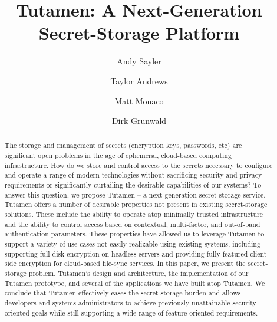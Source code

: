\documentclass[10pt,twocolumn]{article}
\begin{document}
\title{Tutamen: A Next-Generation Secret-Storage Platform}

\author{Andy Sayler}
\author{Taylor Andrews}
\author{Matt Monaco}
\author{Dirk Grunwald}

\date{}

\maketitle

\begin{abstract}
The storage and management of secrets (encryption keys, passwords,
etc) are significant open problems in the age of ephemeral,
cloud-based computing infrastructure. How do we store and control
access to the secrets necessary to configure and operate a range of
modern technologies without sacrificing security and privacy
requirements or significantly curtailing the desirable capabilities of
our systems? To answer this question, we propose Tutamen -- a
next-generation secret-storage service. Tutamen offers a number of
desirable properties not present in existing secret-storage
solutions. These include the ability to operate atop minimally trusted
infrastructure and the ability to control access based on contextual,
multi-factor, and out-of-band authentication parameters. These
properties have allowed us to leverage Tutamen to support a variety of
use cases not easily realizable using existing systems, including
supporting full-disk encryption on headless servers and providing
fully-featured client-side encryption for cloud-based file-sync
services. In this paper, we present the secret-storage problem,
Tutamen's design and architecture, the implementation of our Tutamen
prototype, and several of the applications we have built atop Tutamen.
We conclude that Tutamen effectively eases the secret-storage burden
and allows developers and systems administrators to achieve previously
unattainable security-oriented goals while still supporting a wide
range of feature-oriented requirements.
\end{abstract}








{
  
  
}
\end{document}
